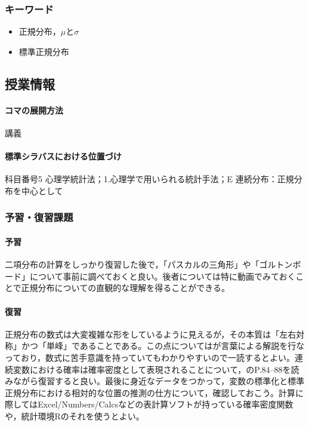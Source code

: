 \subsubsection{キーワード}
\begin{itemize}
\item 正規分布，$\mu$と$\sigma$
\item 標準正規分布
\end{itemize}
\subsection{授業情報}
\paragraph{コマの展開方法}
講義
\paragraph{標準シラバスにおける位置づけ}
科目番号5 心理学統計法；1.心理学で用いられる統計手法；E 連続分布：正規分布を中心として 
\subsubsection{予習・復習課題}
\paragraph{予習}
二項分布の計算をしっかり復習した後で，「パスカルの三角形」や「ゴルトンボード」について事前に調べておくと良い。後者については特に動画でみておくことで正規分布についての直観的な理解を得ることができる。
\paragraph{復習}
正規分布の数式は大変複雑な形をしているように見えるが，その本質は「左右対称」かつ「単峰」であることである。この点については\citet{長沼201611}が言葉による解説を行なっており，数式に苦手意識を持っていてもわかりやすいので一読するとよい。連続変数における確率は確率密度として表現されることについて，\citet{Maeda2017}のP.84--88を読みながら復習すると良い。最後に身近なデータをつかって，変数の標準化と標準正規分布における相対的な位置の推測の仕方について，確認しておこう。計算に際してはExcel/Numbers/Calcsなどの表計算ソフトが持っている確率密度関数や，統計環境Rのそれを使うとよい。